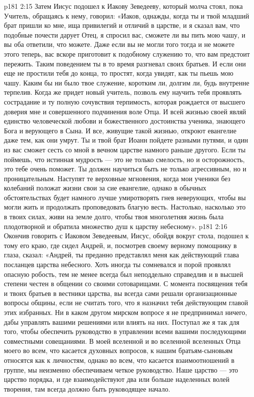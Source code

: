 \vs p181 2:15 \pc Затем Иисус подошел к Иакову Зеведееву, который молча стоял, пока Учитель, обращаясь к нему, говорил: «Иаков, однажды, когда ты и твой младший брат пришли ко мне, ища привилегий и отличий в царстве, и я сказал вам, что подобные почести дарует Отец, я спросил вас, сможете ли вы пить мою чашу, и вы оба ответили, что можете. Даже если вы не могли того тогда и не можете этого теперь, вас вскоре приготовит к подобному служению то, что вам предстоит пережить. Таким поведением ты в то время разгневал своих братьев. И если они еще не простили тебя до конца, то простят, когда увидят, как ты пьешь мою чашу. Каким бы ни было твое служение, коротким ли, долгим ли, будь внутренне терпелив. Когда же придет новый учитель, позволь ему научить тебя проявлять сострадание и ту полную сочувствия терпимость, которая рождается от высшего доверия мне и совершенного подчинения воле Отца. И всей жизнью своей являй единство человеческой любови и божественного достоинства ученика, знающего Бога и верующего в Сына. И все, живущие такой жизнью, откроют евангелие даже тем, как они умрут. Ты и твой брат Иоанн пойдете разными путями, и один из вас сможет сесть со мной в вечном царстве намного раньше другого. Если ты поймешь, что истинная мудрость --- это не только смелость, но и осторожность, это тебе очень поможет. Ты должен научиться быть не только агрессивным, но и проницательным. Наступят те верховные мгновения, когда мои ученики без колебаний положат жизни свои за сие евангелие, однако в обычных обстоятельствах будет намного лучше умиротворять гнев неверующих, чтобы вы могли жить и продолжать проповедовать благую весть. Настолько, насколько это в твоих силах, живи на земле долго, чтобы твоя многолетняя жизнь была плодотворной и обратила множество душ к царству небесному».
\vs p181 2:16 \pc Окончив говорить с Иаковом Зеведеевым, Иисус, обойдя вокруг стола, подошел к тому его краю, где сидел Андрей, и, посмотрев своему верному помощнику в глаза, сказал: «Андрей, ты преданно представлял меня как действующий глава посланцев царства небесного. Хоть иногда ты сомневался и порой проявлял опасную робость, тем не менее всегда был неподдельно справедлив и в высшей степени честен в общении со своими сотоварищами. С момента посвящения тебя и твоих братьев в вестники царства, вы всегда сами решали организационные вопросы общины, если не считать того, что я назначил тебя действующим главой этих избранных. Ни в каком другом мирском вопросе я не предпринимал ничего, дабы управлять вашими решениями или влиять на них. Поступал же я так для того, чтобы обеспечить руководство в управлении всеми вашими последующими совместными совещаниями. В моей вселенной и во вселенной вселенных Отца моего во всем, что касается духовных вопросов, к нашим братьям\hyp{}сыновьям относятся как к личностям, однако во всем, что касается взаимоотношений в группе, мы неизменно обеспечиваем четкое руководство. Наше царство --- это царство порядка, и где взаимодействуют два или больше наделенных волей творения, там всегда должно быть руководящее начало.
